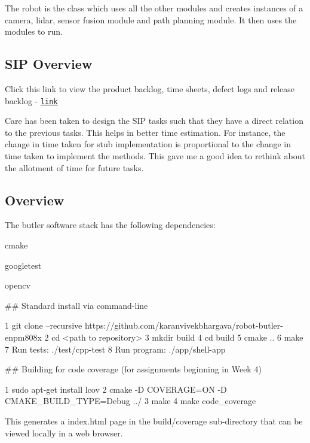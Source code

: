 The robot is the class which uses all the other modules and creates instances of a camera, lidar, sensor fusion module and path planning module. It then uses the modules to run. 

 



 \subsection*{S\+IP Overview}

Click this link to view the product backlog, time sheets, defect logs and release backlog -\/ \href{https://docs.google.com/spreadsheets/d/1WOvV6iL4gGOF8Qacwj2R3Lom71wziKXEf_UEhdGfOuY/edit?usp=sharing}{\tt link}

Care has been taken to design the S\+IP tasks such that they have a direct relation to the previous tasks. This helps in better time estimation. For instance, the change in time taken for stub implementation is proportional to the change in time taken to implement the methods. This gave me a good idea to rethink about the allotment of time for future tasks. 

 \subsection*{Overview}

The butler software stack has the following dependencies\+:
\begin{DoxyItemize}
\item cmake
\item googletest
\item opencv
\end{DoxyItemize}

\#\# Standard install via command-\/line 
\begin{DoxyCode}
1 git clone --recursive https://github.com/karanvivekbhargava/robot-butler-enpm808x
2 cd <path to repository>
3 mkdir build
4 cd build
5 cmake ..
6 make
7 Run tests: ./test/cpp-test
8 Run program: ./app/shell-app
\end{DoxyCode}


\#\# Building for code coverage (for assignments beginning in Week 4) 
\begin{DoxyCode}
1 sudo apt-get install lcov
2 cmake -D COVERAGE=ON -D CMAKE\_BUILD\_TYPE=Debug ../
3 make
4 make code\_coverage
\end{DoxyCode}
 This generates a index.\+html page in the build/coverage sub-\/directory that can be viewed locally in a web browser.


